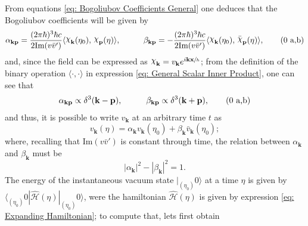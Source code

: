 From equations \ref{eq: Bogoliubov Coefficients General} one deduces that the Bogoliubov coefficients will be given by
\begin{subequations}
	\begin{gather}
		\alpha_{\mathbf{kp}}=\frac{(2\pi\hbar)^3\hbar c}{2\text{Im}(v\bar v')}\langle \rchi_\mathbf{k}(\eta_0),\,\rchi_\mathbf{p}(\eta)\rangle,\hspace{1.0cm}\beta_{\mathbf{kp}}=-\frac{(2\pi\hbar)^3\hbar c}{2\text{Im}(v\bar v')}\langle \rchi_\mathbf{k}(\eta_0),\,\bar \rchi_\mathbf{p}(\eta)\rangle,\tag{\theequation \,\,a,b}
	\end{gather}
\end{subequations}
and, since the field can be expressed as $\rchi_\mathbf{k}=v_\mathbf{k}e^{i\mathbf{kx}\sfrac{}{h}}$; from the definition of the binary operation $\langle\cdot,\cdot\rangle$ in expression \ref{eq: General Scalar Inner Product}, one can see that
\begin{subequations}
	\begin{gather}
		\alpha_{\mathbf{kp}}\propto \delta^3(\mathbf{k}-\mathbf{p}),\hspace{1.0cm}\beta_{\mathbf{kp}}\propto \delta^3(\mathbf{k}+\mathbf{p}),\tag{\theequation \,\,a,b}
	\end{gather}
\end{subequations}
and thus, it is possible to write $v_\mathbf{k}$ at an arbitrary time $t$ as
\begin{equation}
	v_\mathbf{k}(\eta)=\alpha_\mathbf{k}v_\mathbf{k}(\eta_0)+\beta_\mathbf{k}\bar v_\mathbf{k}(\eta_0);
\end{equation}
where, recalling that $\text{Im}(v\bar v')$ is constant through time, the relation between $\alpha_\mathbf{k}$ and $\beta_\mathbf{k}$ must be
\begin{equation}\label{eq: Bogoliubov coefficients relation Expanding}
	|\alpha_\mathbf{k}|^2-|\beta_\mathbf{k}|^2=1.
\end{equation}
The energy of the instantaneous vacuum state $|_{(\eta_0)}0\rangle$ at a time $\eta$ is given by $\langle_{(\eta_0)}0|\hat{\mathcal{H}}(\eta)|_{(\eta_0)}0\rangle$, were the hamiltonian $\hat{\mathcal{H}}(\eta)$ is given by expression \ref{eq: Expanding Hamiltonian}; to compute that, lets first obtain


